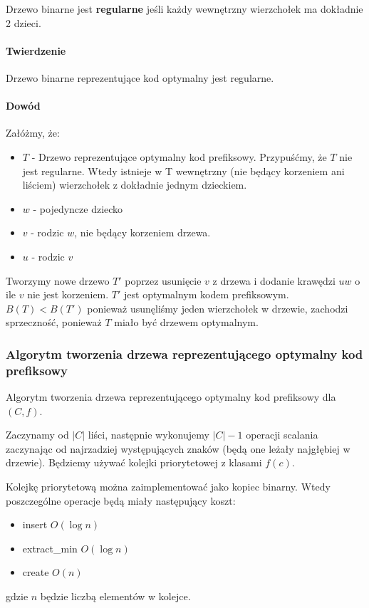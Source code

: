 Drzewo binarne jest \textbf{regularne} jeśli każdy wewnętrzny wierzchołek ma dokładnie 2 dzieci.

\paragraph{Twierdzenie}{Drzewo binarne reprezentujące kod optymalny jest regularne.}

\paragraph{Dowód\\}{}
Załóżmy, że:
\begin{itemize}
\item $T$ - Drzewo reprezentujące optymalny kod prefiksowy. Przypuśćmy, że $T$ nie jest regularne. Wtedy istnieje w T wewnętrzny (nie będący korzeniem ani liściem) wierzchołek z dokładnie jednym dzieckiem.
\item $w$ - pojedyncze dziecko
\item $v$ - rodzic $w$, nie będący korzeniem drzewa.
\item $u$ - rodzic $v$
\end{itemize}

Tworzymy nowe drzewo $T'$ poprzez usunięcie $v$ z drzewa i dodanie krawędzi $uw$ o ile $v$ nie jest korzeniem. $T'$ jest optymalnym kodem prefiksowym. 
$B(T) < B(T')$ ponieważ usunęliśmy jeden wierzchołek w drzewie, zachodzi sprzeczność, ponieważ $T$ miało być drzewem optymalnym.

\subsubsection{Algorytm tworzenia drzewa reprezentującego optymalny kod prefiksowy}
Algorytm tworzenia drzewa reprezentującego optymalny kod prefiksowy dla $(C,f)$. 

Zaczynamy od $|C|$ liści, następnie wykonujemy $|C|-1$ operacji scalania zaczynając od najrzadziej występujących znaków (będą one leżały najgłębiej w drzewie). Będziemy używać kolejki priorytetowej z klasami $f(c)$. 

Kolejkę priorytetową można zaimplementować jako kopiec binarny. Wtedy poszczególne operacje będą miały następujący koszt:
\begin{itemize}
\item insert $O(\log n)$ 
\item extract\_min $O(\log n)$
\item create $O(n)$
\end{itemize}
gdzie $n$ będzie liczbą elementów w kolejce.

